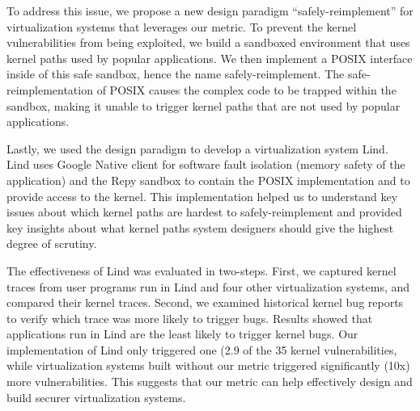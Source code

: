 To address this issue, we propose a new design paradigm
“safely-reimplement” for virtualization systems that leverages our metric.
To prevent the kernel vulnerabilities from being exploited, we build a
sandboxed environment that uses kernel paths used by popular applications.
We then implement a POSIX interface inside of this safe sandbox, hence the
name safely-reimplement. The safe-reimplementation of POSIX causes the
complex code to be trapped within the sandbox, making it unable to trigger
kernel paths that are not used by popular applications.

Lastly, we used the design paradigm to develop a virtualization system
Lind.  Lind uses Google Native client for software fault isolation (memory
safety of the application) and the Repy sandbox to contain the POSIX
implementation and to provide access to the kernel.  This implementation
helped us to understand key issues about which kernel paths are hardest to
safely-reimplement and provided key insights about what kernel paths system
designers should give the highest degree of scrutiny.

The effectiveness of Lind was evaluated in two-steps. First, we captured
kernel traces from user programs run in Lind and four other virtualization
systems, and compared their kernel traces. Second, we examined historical
kernel bug reports to verify which trace was more likely to trigger bugs.
Results showed that applications run in Lind are the least likely to
trigger kernel bugs. Our implementation of Lind only triggered one (2.9%
of the 35 kernel vulnerabilities, while virtualization systems built
without our metric triggered significantly (10x) more vulnerabilities. This
suggests that our metric can help effectively design and build securer
virtualization systems.

